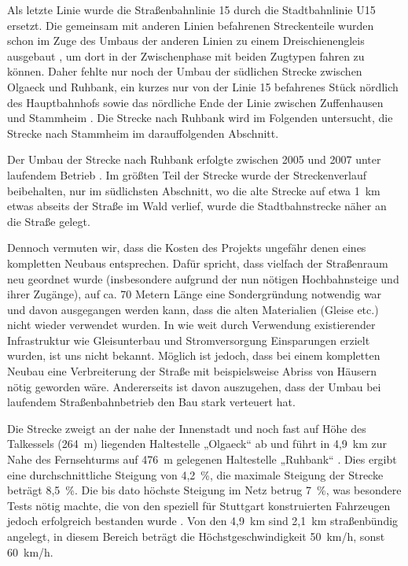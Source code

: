 Als letzte \cite{u15vorinfo} Linie wurde die Straßenbahnlinie 15 durch die
Stadtbahnlinie U15 ersetzt.  Die gemeinsam mit anderen Linien befahrenen
Streckenteile wurden schon im Zuge des Umbaus der anderen Linien zu einem
Dreischienengleis ausgebaut \cite{beob}, um dort in der Zwischenphase mit beiden
Zugtypen fahren zu können.  Daher fehlte nur noch der Umbau der südlichen
Strecke zwischen Olgaeck und Ruhbank, ein kurzes nur von der Linie 15 befahrenes
Stück nördlich des Hauptbahnhofs sowie das nördliche Ende der Linie zwischen
Zuffenhausen und Stammheim \cite{u15mail}.  Die Strecke nach Ruhbank wird im
Folgenden untersucht, die Strecke nach Stammheim im darauffolgenden Abschnitt.

Der Umbau der Strecke nach Ruhbank erfolgte zwischen 2005 und 2007 unter
laufendem Betrieb \cite{u15seb}.  Im größten Teil der Strecke wurde der
Streckenverlauf beibehalten, nur im südlichsten Abschnitt, wo die alte Strecke
auf etwa 1{\ }km etwas abseits der Straße im Wald verlief, wurde die
Stadtbahnstrecke näher an die Straße gelegt.

Dennoch vermuten wir, dass die Kosten des Projekts ungefähr denen eines
kompletten Neubaus entsprechen.  Dafür spricht, dass vielfach der Straßenraum
neu geordnet wurde (insbesondere aufgrund der nun nötigen Hochbahnsteige und
ihrer Zugänge), auf ca. 70 Metern Länge eine Sondergründung notwendig war
\cite{u15mail} und davon ausgegangen werden kann, dass die alten Materialien
(Gleise etc.) nicht wieder verwendet wurden.  In wie weit durch Verwendung
existierender Infrastruktur wie Gleisunterbau und Stromversorgung Einsparungen
erzielt wurden, ist uns nicht bekannt.  Möglich ist jedoch, dass bei einem
kompletten Neubau eine Verbreiterung der Straße mit beispielsweise Abriss von
Häusern nötig geworden wäre.  Andererseits ist davon auszugehen, dass der Umbau
bei laufendem Straßenbahnbetrieb den Bau stark verteuert hat.

Die Strecke zweigt an der nahe der Innenstadt und noch fast auf Höhe des
Talkessels (264{\ }m) liegenden Haltestelle „Olgaeck“ ab und führt in 4,9{\ }km
zur Nahe des Fernsehturms auf 476{\ }m gelegenen Haltestelle „Ruhbank“
\cite{u15vorinfo}.  Dies ergibt eine durchschnittliche Steigung von 4,2{\ }\%,
die maximale Steigung der Strecke beträgt 8,5{\ }\%. Die bis dato höchste
Steigung im Netz betrug 7{\ }\%, was besondere Tests nötig machte, die von den
speziell für Stuttgart konstruierten Fahrzeugen jedoch erfolgreich bestanden
wurde \cite{u15vorinfo}.  Von den 4,9{\ }km sind 2,1{\ }km straßenbündig
angelegt, in diesem Bereich beträgt die Höchstgeschwindigkeit 50{\ }km/h, sonst
60{\ }km/h.

